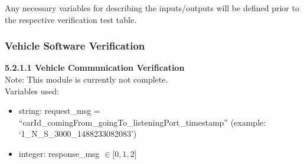 \documentclass [10pt]{article}
\begin{document}
Any necessary variables for describing the inputs/outputs will be defined prior to the respective verification test table. \\

\subsubsection{Vehicle Software Verification}



    
    
    \textbf{5.2.1.1 Vehicle Communication Verification} \vspace{2mm}\\
    Note: This module is currently not complete. \\
    Variables used:
    \begin{itemize}[topsep=0pt]
        \item string: request\_msg = ``carId\_comingFrom\_goingTo\_listeningPort\_timestamp'' (example: `1\_N\_S\_3000\_1488233082083')
        \item  integer: response\_msg $\in \big[0, 1, 2\big] $ 
    \end{itemize}
    \vspace{0.5cm}
    
\end{document}
